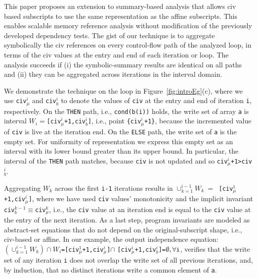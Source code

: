\documentclass[10pt,nocopyrightspace]{sigplanconf}
\begin{document}
This paper proposes an extension to summary-based analysis 
that allows  {\sc civ} based subscripts to use the same representation  
as the affine subscripts. This enables scalable memory reference analysis
without modification of the previously developed dependency tests.
%
The gist of our technique is to aggregate symbolically the {\sc civ} 
references on every control-flow path of the analyzed loop, in terms
of the {\sc civ} values at the entry and end of each iteration or loop.
The analysis succeeds if (i) the symbolic-summary results are identical 
on all paths and (ii) they can be aggregated across iterations 
in the interval domain. 

We demonstrate the technique on the loop in Figure~\ref{fig:introEg}(c),
where we use {\tt civ$_\mu^i$} and {\tt civ$_b^i$} to denote the values of 
{\tt civ} at the entry and end of iteration {\tt i}, respectively.
%
On the {\tt THEN} path, i.e., {\tt cond(b(i))} holds, the write set 
of array {\tt a} is interval $W_i=${\tt [civ$_\mu^i$+1,civ$_b^i$]}, 
i.e., point {\tt \{civ$_\mu^i$+1\}}, because the incremented value 
of {\tt civ} is live at the iteration end. 
%
On the {\tt ELSE} path, the write set of {\tt a} is the empty set.
For uniformity of representation we express this empty set as an interval
with its lower bound
greater than its upper bound. In particular, the interval of the
{\tt THEN} path matches, because {\tt civ} is not updated and so
{\tt civ$_\mu^i$+1>civ$_b^i$}.


Aggregating $W_k$ across the first {\tt i-1} iterations results in
$\cup_{k=1}^{i-1}W_k \ = \ $ {\tt [civ$_\mu^1$+1,civ$_\mu^i$]}, 
where we have used {\tt civ} values'
monotonicity and the implicit invariant {\tt civ$_b^{k-1}\equiv$civ$_\mu^{k}$},
i.e., the {\tt civ} value at an iteration end is equal to the {\tt civ}
value at the entry of the next iteration. 
%
%
As a last step, program invariants are modeled as abstract-set equations
that do not depend on the original-subscript shape, i.e., 
{\sc civ}-based or affine. 
%
In our example, the output independence equation:\\
$(\cup_{k=1}^{i-1}W_k)\cap W_i${\tt=[civ$_\mu^1$+1,civ$_\mu^i$]}$\cap$
{\tt [civ$_\mu^i$+1,civ$_b^i$]=}$\emptyset,\forall\mbox{\tt{}i}$,
verifies that the write set of any iteration {\tt i} does not overlap
the write set of all previous iterations, and, by induction,
that no distinct iterations write a common element of {\tt a}.
\end{document}
